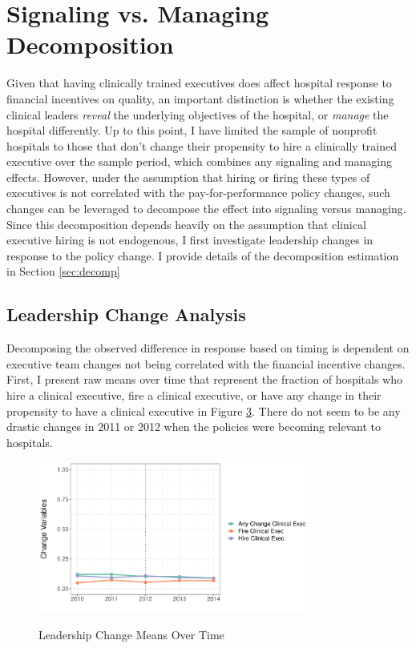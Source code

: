 \documentclass[12pt]{article}
\begin{document}
\begin{figure}[ht!]
\begin{subfigure}[b]{0.45\textwidth}
         \label{fig:mort_synth_plotc}
     \end{subfigure}
        \label{fig:mort_synth_plot}
    \end{figure}
    

\section{Signaling vs. Managing Decomposition}\label{sec:sig_man}

    Given that having clinically trained executives does affect hospital response to financial incentives on quality, an important distinction is whether the existing clinical leaders \textit{reveal} the underlying objectives of the hospital, or \textit{manage} the hospital differently. Up to this point, I have limited the sample of nonprofit hospitals to those that don't change their propensity to hire a clinically trained executive over the sample period, which combines any signaling and managing effects. However, under the assumption that hiring or firing these types of executives is not correlated with the pay-for-performance policy changes, such changes can be leveraged to decompose the effect into signaling versus managing. Since this decomposition depends heavily on the assumption that clinical executive hiring is not endogenous, I first investigate leadership changes in response to the policy change. I provide details of the decomposition estimation in Section \ref{sec:decomp}

    \subsection{Leadership Change Analysis} \label{sec:changes}

    Decomposing the observed difference in response based on timing is dependent on executive team changes not being correlated with the financial incentive changes. First, I present raw means over time that represent the fraction of hospitals who hire a clinical executive, fire a clinical executive, or have any change in their propensity to have a clinical executive in Figure \ref{fig:change_means}. There do not seem to be any drastic changes in 2011 or 2012 when the policies were becoming relevant to hospitals. 

    \begin{figure}[ht!]
    \centering
    \caption{Leadership Change Means Over Time}
    \includegraphics[width=0.8\textwidth]{Objects/change_means.pdf}
    \label{fig:change_means}
     \end{figure}
\end{document}
